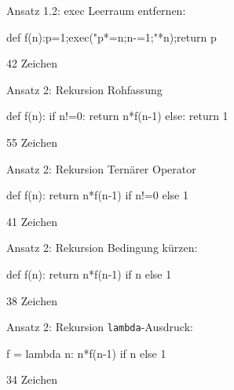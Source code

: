 \documentclass[xcolor=dvipsnames, aspectratio=169, 14pt]{beamer}
\begin{document}
\begin{frame}[fragile]{Ansatz 1.2: exec}
	Leerraum entfernen:
	
	\vfill
	
	\begin{python3code}
	def f(n):p=1;exec("p*=n;n-=1;"*n);return p
	\end{python3code}
	
	\vfill
	
	42 Zeichen
\end{frame}







\begin{frame}[fragile]{Ansatz 2: Rekursion}
	Rohfassung
	
	\vfill
	
	\begin{python3code}
	def f(n):
	   if n!=0:
	      return n*f(n-1)
	   else:
	      return 1
	\end{python3code}
	\vfill
	
	55 Zeichen
\end{frame}

\begin{frame}[fragile]{Ansatz 2: Rekursion}
	Ternärer Operator
	
	\vfill
	
	\begin{python3code}
	def f(n):
	   return n*f(n-1) if n!=0 else 1
	\end{python3code}
	\vfill
	
	41 Zeichen
\end{frame}

\begin{frame}[fragile]{Ansatz 2: Rekursion}
	Bedingung kürzen:
	
	\vfill
	
	\begin{python3code}
	def f(n):
	   return n*f(n-1) if n else 1
	\end{python3code}
	\vfill
	
	38 Zeichen
\end{frame}

\begin{frame}[fragile]{Ansatz 2: Rekursion}
	\texttt{lambda}-Ausdruck:
	
	\vfill
	
	\begin{python3code}
	f = lambda n: n*f(n-1) if n else 1
	\end{python3code}
	\vfill
	
	34 Zeichen
\end{frame}
\end{document}
